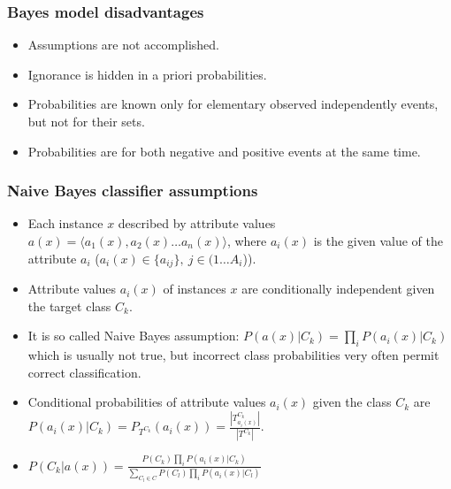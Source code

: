 \documentclass[proffesionalfonts]{beamer}
\begin{document}
\begin{frame}\frametitle{Bayes model disadvantages}
\begin{center}
\large
\begin{itemize}
\item
Assumptions are not accomplished.
\item
Ignorance is hidden in a priori probabilities.
\item
Probabilities are known only for elementary observed independently events, but not for their sets.
\item
Probabilities are for both negative and positive events at the same time.
\end{itemize}
\normalsize
\end{center}
\end{frame}

\begin{frame}
\frametitle{Naive Bayes classifier assumptions}
\begin{itemize}
\item
Each instance $x$ described by attribute values $a(x)=\langle a_1(x), a_2(x) \ldots a_n(x) \rangle$, where $a_i(x)$ is the given value of the attribute $a_i$ ($a_i(x)\in \{a_{ij}\},\ j\in (1\ldots A_i$)). 
\item
Attribute values $a_i(x)$ of instances $x$ are conditionally independent given the target class $C_k$.
\item
It is so called Naive Bayes assumption: 
$\displaystyle P(a(x)|C_k) = \prod_i P(a_i(x) | C_k)$\\
which is usually not true, but incorrect class probabilities very often permit correct classification.
\item 
Conditional probabilities of attribute values $a_i(x)$ given the class $C_k$ are $P(a_i(x) | C_k) = P_{T^{C_k}}(a_i(x)) = \frac{|T^{C_k}_{a_i(x)}|}{|T^{C_k}|}$.
\item
$\displaystyle P(C_k|a(x)) = \frac{P(C_k) \prod_i P(a_i(x) | C_k)}{\sum_{C_l\in C}P(C_l) \prod_i P(a_i(x) | C_l)}$
\end{itemize}
\end{frame}
\end{document}
